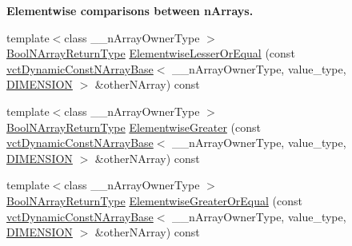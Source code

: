 \begin{Indent}{\bf Elementwise comparisons between n\+Arrays.}
\begin{DoxyCompactItemize}
\item 
{\footnotesize template$<$class \+\_\+\+\_\+n\+Array\+Owner\+Type $>$ }\\\hyperlink{classvct_dynamic_const_n_array_base_a983f2b7edd51a896d447383b5a5af289}{Bool\+N\+Array\+Return\+Type} \hyperlink{classvct_dynamic_const_n_array_base_acff51e0574229f5daef41282e1006268}{Elementwise\+Lesser\+Or\+Equal} (const \hyperlink{classvct_dynamic_const_n_array_base}{vct\+Dynamic\+Const\+N\+Array\+Base}$<$ \+\_\+\+\_\+n\+Array\+Owner\+Type, value\+\_\+type, \hyperlink{classvct_dynamic_const_n_array_base_a815ac316ebc1bb2ab1969d307549826faf759c9ab831ff929b89af4ea2865a378}{D\+I\+M\+E\+N\+S\+I\+O\+N} $>$ \&other\+N\+Array) const 
\item 
{\footnotesize template$<$class \+\_\+\+\_\+n\+Array\+Owner\+Type $>$ }\\\hyperlink{classvct_dynamic_const_n_array_base_a983f2b7edd51a896d447383b5a5af289}{Bool\+N\+Array\+Return\+Type} \hyperlink{classvct_dynamic_const_n_array_base_a69a41e84d9bd4c2f46b2766780a97d82}{Elementwise\+Greater} (const \hyperlink{classvct_dynamic_const_n_array_base}{vct\+Dynamic\+Const\+N\+Array\+Base}$<$ \+\_\+\+\_\+n\+Array\+Owner\+Type, value\+\_\+type, \hyperlink{classvct_dynamic_const_n_array_base_a815ac316ebc1bb2ab1969d307549826faf759c9ab831ff929b89af4ea2865a378}{D\+I\+M\+E\+N\+S\+I\+O\+N} $>$ \&other\+N\+Array) const 
\item 
{\footnotesize template$<$class \+\_\+\+\_\+n\+Array\+Owner\+Type $>$ }\\\hyperlink{classvct_dynamic_const_n_array_base_a983f2b7edd51a896d447383b5a5af289}{Bool\+N\+Array\+Return\+Type} \hyperlink{classvct_dynamic_const_n_array_base_a9f9fde02f72d3f2619e80133f377ebe3}{Elementwise\+Greater\+Or\+Equal} (const \hyperlink{classvct_dynamic_const_n_array_base}{vct\+Dynamic\+Const\+N\+Array\+Base}$<$ \+\_\+\+\_\+n\+Array\+Owner\+Type, value\+\_\+type, \hyperlink{classvct_dynamic_const_n_array_base_a815ac316ebc1bb2ab1969d307549826faf759c9ab831ff929b89af4ea2865a378}{D\+I\+M\+E\+N\+S\+I\+O\+N} $>$ \&other\+N\+Array) const 
\end{DoxyCompactItemize}
\end{Indent}
